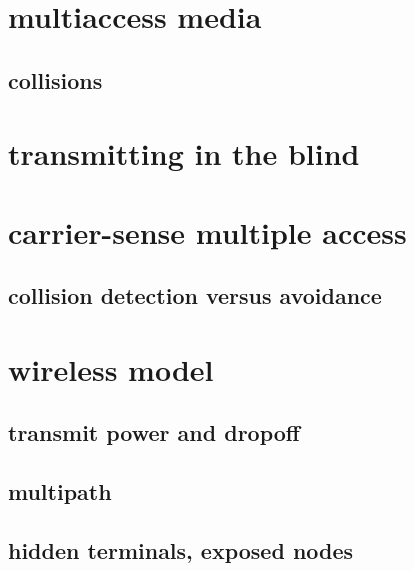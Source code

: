 \section{multiaccess media}



\subsection{collisions}


\section{transmitting in the blind}


\section{carrier-sense multiple access}


\subsection{collision detection versus avoidance}


\section{wireless model}


\subsection{transmit power and dropoff}

\subsection{multipath}

\subsection{hidden terminals, exposed nodes}

